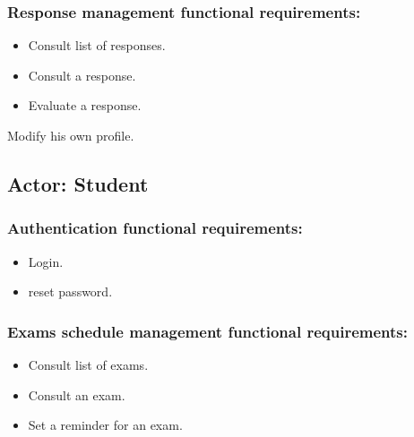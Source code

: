 \documentclass[a4paper,12p]{article}
\begin{document}
     \subsubsection{Response management functional requirements:}
     \begin{itemize}
         \item Consult list of responses.
         \item Consult a response.
         \item Evaluate a response.
     \end{itemize}

     \item Modify his own profile.

     \subsection{Actor: Student}
     \subsubsection{Authentication functional requirements:}
     \begin{itemize}
         \item Login.
         \item reset password.
     \end{itemize}

     \subsubsection{Exams schedule management functional requirements:}
     \begin{itemize}
         \item Consult list of exams.
         \item Consult an exam.
         \item Set a reminder for an exam.
     \end{itemize}
\end{document}

